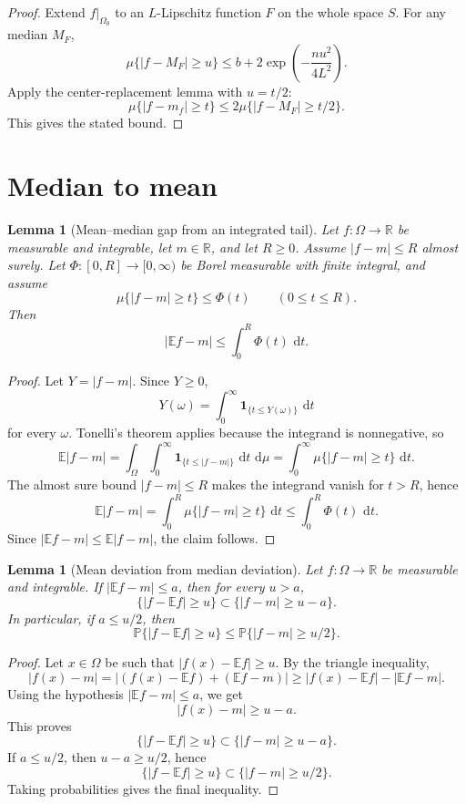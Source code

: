 \documentclass[11pt,oneside]{book}
\newtheorem{lemma}[theorem]{Lemma}
\newcommand{\R}{\mathbb R}
\newcommand{\E}{\mathbb E}
\newcommand{\Prob}{\mathbb P}
\newcommand{\1}{\mathbf 1}
\newcommand{\dd}{\,\mathrm d}
\begin{document}
\begin{proof}
Extend \(f|_{\Omega_0}\) to an \(L\)-Lipschitz function \(F\) on the whole
space \(S\).  For any median \(M_F\),
\[
  \mu\{|f-M_F|\ge u\}
  \le b+2\exp\!\left(-\frac{n u^2}{4L^2}\right).
\]
Apply the center-replacement lemma with \(u=t/2\):
\[
  \mu\{|f-m_f|\ge t\}
  \le 2\mu\{|f-M_F|\ge t/2\}.
\]
This gives the stated bound.
\end{proof}

\section{Median to mean}

\begin{lemma}[Mean--median gap from an integrated tail]
Let \(f:\Omega\to\R\) be measurable and integrable, let \(m\in\R\), and let
\(R\ge0\).  Assume \(|f-m|\le R\) almost surely.  Let
\(\Phi:[0,R]\to[0,\infty)\) be Borel measurable with finite integral, and
assume
\[
  \mu\{|f-m|\ge t\}\le \Phi(t)\qquad(0\le t\le R).
\]
Then
\[
  |\E f-m|\le\int_0^R \Phi(t)\,\dd t.
\]
\end{lemma}

\begin{proof}
Let \(Y=|f-m|\).  Since \(Y\ge0\),
\[
  Y(\omega)=\int_0^\infty \1_{\{t\le Y(\omega)\}}\,\dd t
\]
for every \(\omega\).  Tonelli's theorem applies because the integrand is
nonnegative, so
\[
  \E|f-m|
  =
  \int_\Omega\int_0^\infty \1_{\{t\le |f-m|\}}\,\dd t\,\dd\mu
  =
  \int_0^\infty \mu\{|f-m|\ge t\}\,\dd t.
\]
The almost sure bound \(|f-m|\le R\) makes the integrand vanish for \(t>R\),
hence
\[
  \E|f-m|
  =
  \int_0^R \mu\{|f-m|\ge t\}\,\dd t
  \le
  \int_0^R\Phi(t)\,\dd t.
\]
Since \(|\E f-m|\le\E|f-m|\), the claim follows.
\end{proof}

\begin{lemma}[Mean deviation from median deviation]
Let \(f:\Omega\to\R\) be measurable and integrable.  If
\(|\E f-m|\le a\), then for every \(u>a\),
\[
  \{|f-\E f|\ge u\}\subset \{|f-m|\ge u-a\}.
\]
In particular, if \(a\le u/2\), then
\[
  \Prob\{|f-\E f|\ge u\}\le \Prob\{|f-m|\ge u/2\}.
\]
\end{lemma}

\begin{proof}
Let \(x\in\Omega\) be such that \(|f(x)-\E f|\ge u\).  By the triangle
inequality,
\[
  |f(x)-m|
  =
  |(f(x)-\E f)+(\E f-m)|
  \ge
  |f(x)-\E f|-|\E f-m|.
\]
Using the hypothesis \(|\E f-m|\le a\), we get
\[
  |f(x)-m|\ge u-a.
\]
This proves
\[
  \{|f-\E f|\ge u\}\subset \{|f-m|\ge u-a\}.
\]
If \(a\le u/2\), then \(u-a\ge u/2\), hence
\[
  \{|f-\E f|\ge u\}\subset \{|f-m|\ge u/2\}.
\]
Taking probabilities gives the final inequality.
\end{proof}
\end{document}
